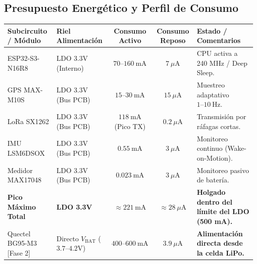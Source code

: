 \subsection*{Presupuesto Energético y Perfil de Consumo}

\begin{table}[H]
\centering
\small
\begin{tabularx}{\textwidth}{|l l c c X|}
\hline
\rowcolor{categorybg}
\textbf{Subcircuito / Módulo} & \textbf{Riel Alimentación} & \textbf{Consumo Activo} & \textbf{Consumo Reposo} & \textbf{Estado / Comentarios} \\ \hline
ESP32-S3-N16R8 & LDO 3.3V (Interno) & $70\text{--}160~\text{mA}$ & $7~\mu\text{A}$ & CPU activa a 240 MHz / Deep Sleep. \\ \hline
GPS MAX-M10S & LDO 3.3V (Bus PCB) & $15\text{--}30~\text{mA}$ & $15~\mu\text{A}$ & Muestreo adaptativo $1\text{--}10~\text{Hz}$. \\ \hline
LoRa SX1262 & LDO 3.3V (Bus PCB) & $118~\text{mA}$ (Pico TX) & $0.2~\mu\text{A}$ & Transmisión por ráfagas cortas. \\ \hline
IMU LSM6DSOX & LDO 3.3V (Bus PCB) & $0.55~\text{mA}$ & $3~\mu\text{A}$ & Monitoreo continuo (Wake-on-Motion). \\ \hline
Medidor MAX17048 & LDO 3.3V (Bus PCB) & $0.023~\text{mA}$ & $3~\mu\text{A}$ & Monitoreo pasivo de batería. \\ \hline
\textbf{Pico Máximo Total} & \textbf{LDO 3.3V} & \textbf{$\approx 221~\text{mA}$} & \textbf{$\approx 28~\mu\text{A}$} & \textbf{Holgado dentro del límite del LDO (500 mA).} \\ \hline
\rowcolor{phase2orange}
Quectel BG95-M3 [Fase 2] & Directo $V_{\text{BAT}}$ ($3.7\text{--}4.2\text{V}$) & $400\text{--}600~\text{mA}$ & $3.9~\mu\text{A}$ & \textbf{Alimentación directa desde la celda LiPo.} \\ \hline
\end{tabularx}
\end{table}